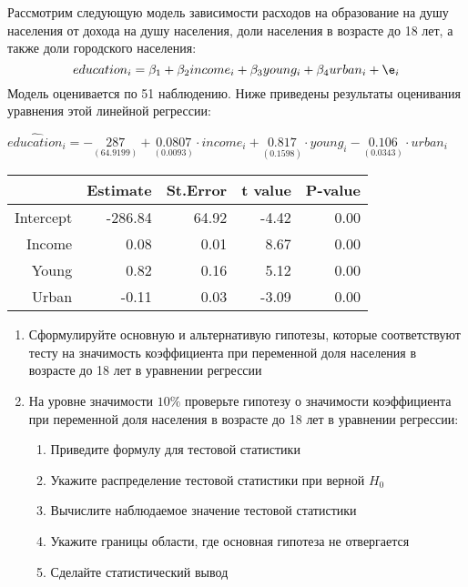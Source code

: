\documentclass[pdftex,11pt,openany]{book}\usepackage[]{graphicx}\usepackage[]{color}
\begin{document}
\begin{problem}
 Рассмотрим следующую модель зависимости расходов на образование на душу населения от дохода на душу населения, доли населения в возрасте до 18 лет, а также доли городского населения: 
\[
education_i = \beta_1 + \beta_2 income_i + \beta_3 young_i + \beta_4 urban_i + \e_i
\]
Модель оценивается по 51 наблюдению. Ниже приведены результаты оценивания уравнения этой линейной регрессии:
\begin{center}
\ensuremath{\widehat{education}_i=-\underset{(64.9199)}{287}+\underset{( 0.0093)}{0.0807}\cdot income_i+\underset{( 0.1598)}{0.817}\cdot young_i-\underset{( 0.0343)}{0.106}\cdot urban_i}%
\begin{table}[ht]
\centering
\begin{tabular}{rrrrr}
  \hline
 & Estimate & St.Error & t value & P-value \\ 
  \hline
Intercept & -286.84 & 64.92 & -4.42 & 0.00 \\ 
  Income & 0.08 & 0.01 & 8.67 & 0.00 \\ 
  Young & 0.82 & 0.16 & 5.12 & 0.00 \\ 
  Urban & -0.11 & 0.03 & -3.09 & 0.00 \\ 
   \hline
\end{tabular}
\end{table}

\end{center}

\begin{enumerate}
\item Сформулируйте основную и альтернативую гипотезы, которые соответствуют тесту на значимость коэффициента при переменной доля населения в возрасте до 18 лет в уравнении регрессии
\item На уровне значимости $10\%$ проверьте гипотезу о значимости коэффициента при переменной доля населения в возрасте до 18 лет в уравнении регрессии:
\begin{enumerate}
\item Приведите формулу для тестовой статистики
\item Укажите распределение тестовой статистики при верной $H_0$
\item Вычислите наблюдаемое значение тестовой статистики
\item Укажите границы области, где основная гипотеза не отвергается
\item Сделайте статистический вывод
\end{enumerate}



\end{enumerate}
\end{problem}
\end{document}
